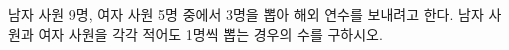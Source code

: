 \hspace*{2mm}\begin{minipage}[t]{\dimexpr\linewidth-2mm\relax}\vspace{0pt}
남자 사원 9명, 여자 사원 5명 중에서 3명을 뽑아 해외 연수를 보내려고 한다. 남자 사원과 여자 사원을 각각 적어도 1명씩 뽑는 경우의 수를 구하시오.\end{minipage}

